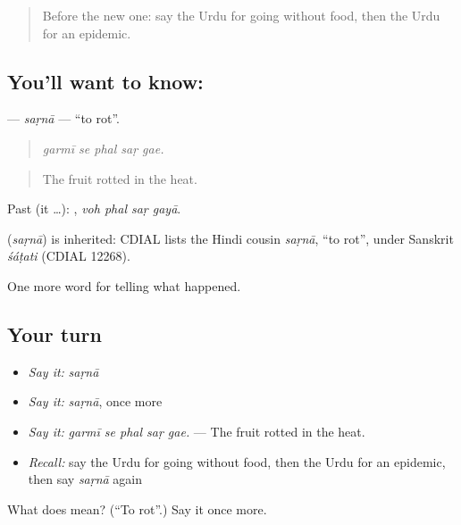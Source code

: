 \begin{quote}
Before the new one: say the Urdu for going without food, then the Urdu for an epidemic.
\end{quote}

\subsection*{You'll want to know: }
\textbf{} — \emph{saṛnā} — \textquotedblleft{}to rot\textquotedblright{}.

\begin{quote}
    
\end{quote}

\begin{quote}
\emph{garmī se phal saṛ gae.}
\end{quote}

\begin{quote}
The fruit rotted in the heat.
\end{quote}

Past (it …):    , \emph{voh phal saṛ gayā}.

\begin{cousinweb}
\textbf{} (\emph{saṛnā}) is inherited: CDIAL lists the Hindi cousin \emph{saṛnā}, \textquotedblleft{}to rot\textquotedblright{}, under Sanskrit \emph{śáṭati} (CDIAL 12268).
\end{cousinweb}

\begin{grammarlens}[title={What you've built}]
One more word for telling what happened.
\end{grammarlens}

\subsection*{Your turn}
\begin{itemize}
\raggedright
  \item \emph{Say it:} \emph{saṛnā}
  \item \emph{Say it:} \emph{saṛnā}, once more
  \item \emph{Say it:} \emph{garmī se phal saṛ gae.} — The fruit rotted in the heat.
  \item \emph{Recall:} say the Urdu for going without food, then the Urdu for an epidemic, then say \emph{saṛnā} again
\end{itemize}

\begin{tcolorbox}[breakable,colback=teal!4,colframe=teal!35!black,title={Before you move on}]
What does  mean? (\textquotedblleft{}To rot\textquotedblright{}.) Say it once more.
\end{tcolorbox}

